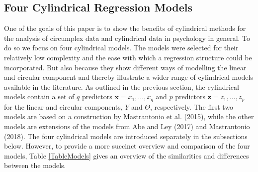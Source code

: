 \documentclass[man,mask]{apa6}
\begin{document}
\subsection{Four Cylindrical Regression Models}\label{Models}

One of the goals of this paper is to show the benefits of cylindrical methods
for the analysis of circumplex data and cylindrical data in psychology in
general. To do so we focus on four cylindrical models. The models were selected
for their relatively low complexity and the ease with which a regression
structure could be incorporated. But also because they show different ways of
modelling the linear and circular component and thereby illustrate a wider range
of cylindrical models available in the literature. As outlined in the previous
section, the cylindrical models contain a set of \(q\) predictors \(\boldsymbol{x} = x_1, \dots, x_q\) and \(p\) predictors \(\boldsymbol{z} = z_1, \dots, z_p\) for the
linear and circular components, \(Y\) and \(\Theta\), respectively. The first
two models are based on a construction by Mastrantonio et al. (2015), while the
other models are extensions of the models from Abe and Ley (2017) and
Mastrantonio (2018). The four cylindrical models are introduced separately
in the subsections below. However, to provide a more succinct overview and
comparison of the four models, Table \ref{TableModels} gives an overview of the
similarities and differences between the models.
\end{document}
